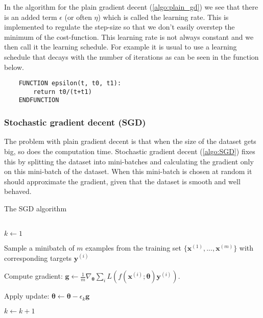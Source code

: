In the algorithm for the plain gradient decent (\ref{algo:plain_gd}) we see that there is an added
term $\epsilon$ (or often $\eta$) which is called the learning rate. This is implemented to regulate
the step-size so that we don't easily overstep the minimum of the
cost-function. This learning rate is not always constant and we then call it
the learning schedule. For example it is usual to use a learning schedule that
decays with the number of iterations as can be seen in the function below.
\begin{lstlisting}
    FUNCTION epsilon(t, t0, t1):
        return t0/(t+t1)
    ENDFUNCTION
\end{lstlisting}


\subsubsection{Stochastic gradient decent (SGD)}
The problem with plain gradient decent is that when the size of the dataset
gets big, so does the computation time. 
Stochastic gradient decent (\ref{algo:SGD}) fixes this by splitting the dataset into mini-batches and calculating the gradient only on this
mini-batch of the dataset. When this mini-batch is chosen at random it should approximate
the gradient, given that the dataset is smooth and well behaved.

\begin{algorithm}
\caption{The SGD algorithm}\label{algo:SGD}
\begin{algorithmic}
    \\
    $k\gets1$

     Sample a minibatch of $m$ examples from the training set
        $\{\boldsymbol{x}^{(1)}, ..., \boldsymbol{x}^{(m)}\}$ with corresponding
        targets $\boldsymbol{y}^{(i)}$
        
        Compute gradient: $\boldsymbol{g} \gets
        \frac{1}{m}\nabla_{\boldsymbol\theta}
        \sum_{i}L(f(\boldsymbol{x}^{(i)};\boldsymbol{\theta})\boldsymbol{y}^{(i)})$.
        
        Apply update: $\boldsymbol{\theta} \gets
        \boldsymbol{\theta}-\epsilon_k\boldsymbol{g}$

        $k\gets k+1$
    \EndWhile
\end{algorithmic}
\end{algorithm}


